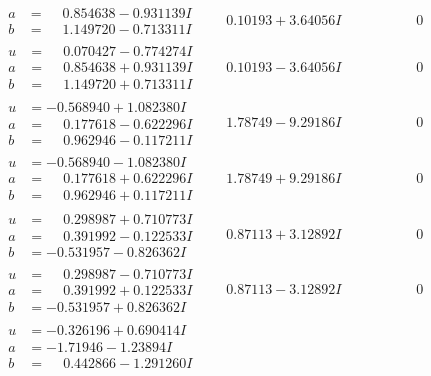 \documentclass[1p]{elsarticle_modified}
\theoremstyle{definition}
\begin{document}
$$\begin{array}{c|c|c}
\begin{aligned}
a &= \phantom{-}0.854638 - 0.931139 I \\
b &= \phantom{-}1.149720 - 0.713311 I\end{aligned}
 & \phantom{-}0.10193 + 3.64056 I & \phantom{-0.000000 } 0 \\ \hline\begin{aligned}
u &= \phantom{-}0.070427 - 0.774274 I \\
a &= \phantom{-}0.854638 + 0.931139 I \\
b &= \phantom{-}1.149720 + 0.713311 I\end{aligned}
 & \phantom{-}0.10193 - 3.64056 I & \phantom{-0.000000 } 0 \\ \hline\begin{aligned}
u &= -0.568940 + 1.082380 I \\
a &= \phantom{-}0.177618 - 0.622296 I \\
b &= \phantom{-}0.962946 - 0.117211 I\end{aligned}
 & \phantom{-}1.78749 - 9.29186 I & \phantom{-0.000000 } 0 \\ \hline\begin{aligned}
u &= -0.568940 - 1.082380 I \\
a &= \phantom{-}0.177618 + 0.622296 I \\
b &= \phantom{-}0.962946 + 0.117211 I\end{aligned}
 & \phantom{-}1.78749 + 9.29186 I & \phantom{-0.000000 } 0 \\ \hline\begin{aligned}
u &= \phantom{-}0.298987 + 0.710773 I \\
a &= \phantom{-}0.391992 - 0.122533 I \\
b &= -0.531957 - 0.826362 I\end{aligned}
 & \phantom{-}0.87113 + 3.12892 I & \phantom{-0.000000 } 0 \\ \hline\begin{aligned}
u &= \phantom{-}0.298987 - 0.710773 I \\
a &= \phantom{-}0.391992 + 0.122533 I \\
b &= -0.531957 + 0.826362 I\end{aligned}
 & \phantom{-}0.87113 - 3.12892 I & \phantom{-0.000000 } 0 \\ \hline\begin{aligned}
u &= -0.326196 + 0.690414 I \\
a &= -1.71946 - 1.23894 I \\
b &= \phantom{-}0.442866 - 1.291260 I\end{aligned}

\end{array}$$
\end{document}
